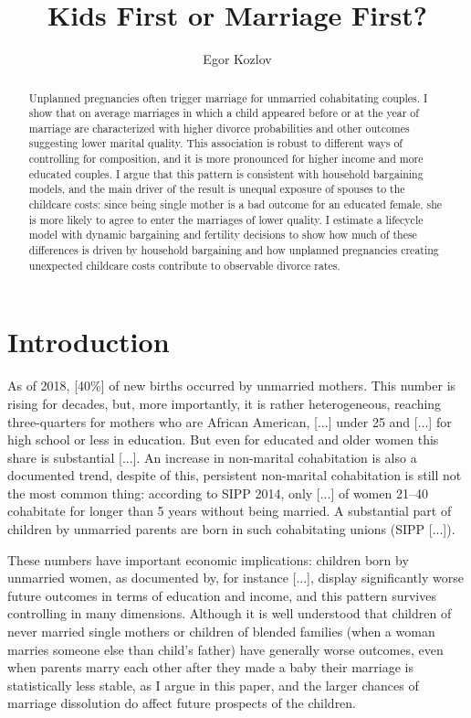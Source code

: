 \documentclass[12pt,letter]{article}
\title{Kids First or Marriage First?}
\author{Egor Kozlov}
\begin{document}
\maketitle



\begin{abstract}
Unplanned pregnancies often trigger marriage for unmarried cohabitating couples. I show that on average marriages in which a child appeared before or at the year of marriage are characterized with higher divorce probabilities and other outcomes suggesting lower marital quality. This association is robust to different ways of controlling for composition, and it is more pronounced for higher income and more educated couples. I argue that this pattern is consistent with household bargaining models, and the main driver of the result is unequal exposure of spouses to the childcare costs: since being single mother is a bad outcome for an educated female, she is more likely to agree to enter the marriages of lower quality. I estimate a lifecycle model with dynamic bargaining and fertility decisions to show how much of these differences is driven by household bargaining and how unplanned pregnancies creating unexpected childcare costs contribute to observable divorce rates.
\end{abstract}

\section{Introduction}
As of 2018, [40\%] of new births occurred by unmarried mothers. This number is rising for decades, but, more importantly, it is rather heterogeneous, reaching three-quarters for mothers who are African American, [...] under 25 and [...] for high school or less in education. But even for educated and older women this share is substantial [...]. An increase in non-marital cohabitation is also a documented trend, despite of this, persistent non-marital cohabitation is still not the most common thing: according to SIPP 2014, only [...] of women 21--40 cohabitate for longer than 5 years without being married. A substantial part of children by unmarried parents are born in such cohabitating unions (SIPP [...]).

These numbers have important economic implications: children born by unmarried women, as documented by, for instance [...], display significantly worse future outcomes in terms of education and income, and this pattern survives controlling in many dimensions. Although it is well understood that children of never married single mothers or children of blended families (when a woman marries someone else than child's father) have generally worse outcomes, even when parents marry each other after they made a baby their marriage is statistically less stable, as I argue in this paper, and the larger chances of marriage dissolution do affect future prospects of the children. 
\end{document}
